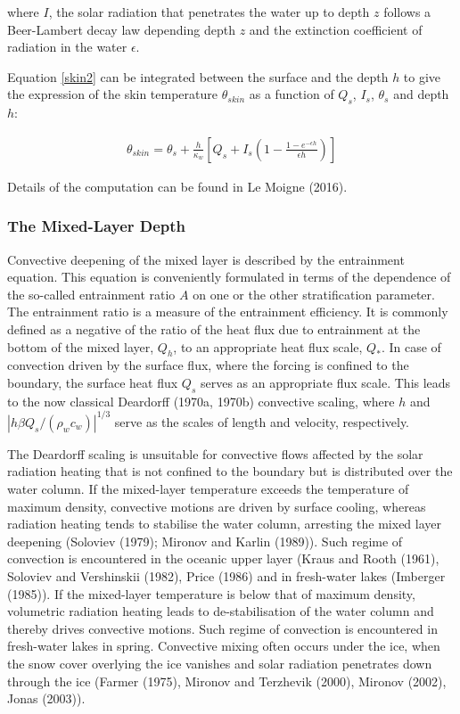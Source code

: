 where $I$, the solar radiation that penetrates the water up to depth $z$ follows a Beer-Lambert decay law 
depending depth $z$ and the extinction coefficient of radiation in the water $\epsilon$.

Equation \ref{skin2} can be integrated between the surface and the depth $h$ to give the 
expression of the skin temperature $\theta_{skin}$ as a function of $Q_s$, $I_s$, $\theta_s$ and depth $h$:

\begin{eqnarray}\label{skin3}
\theta_{skin} = \theta_{s} + \frac{h}{\kappa_w}\left[ Q_s+I_s\left(1-\frac{1-e^{-\epsilon h}}{\epsilon h} \right)\right] 
\end{eqnarray}

Details of the computation can be found in Le Moigne \etal (2016)\nocite{LeMoigne_2016}.


\subsubsection{The Mixed-Layer Depth}
\nopagebreak 
%
\noindent
Convective deepening of the mixed layer is described by the entrainment equation. 
This equation is conveniently formulated in terms of the dependence
of the so-called entrainment ratio $A$ on one or the other stratification parameter. 
The entrainment ratio is a measure of the entrainment efficiency.
It is commonly defined as a negative of the
ratio of the heat flux due to entrainment 
at the bottom of the mixed layer, $Q_h$, 
to an appropriate heat flux scale, $Q_*$. 
In case of convection driven by the surface flux,
where the forcing is confined to the boundary,
the surface heat flux $Q_s$ serves as an appropriate flux scale.
This leads to the now classical Deardorff (1970a, 1970b)\nocite{deardorff1970a,deardorff1970b} convective scaling,
where $h$ and $|h\beta Q_s/(\rho_w c_w)|^{1/3}$ 
serve as the scales of length and velocity, respectively. 

The Deardorff scaling is unsuitable for convective flows
affected by the solar radiation heating that is not 
confined to the boundary but is distributed over the water column.
If the mixed-layer temperature exceeds the temperature of maximum density,
convective motions are driven by surface cooling,
whereas radiation heating tends to stabilise the water column,
arresting the mixed layer deepening
(Soloviev (1979)\nocite{soloviev1979}; Mironov and Karlin (1989)\nocite{mironov1989}).
Such regime of convection is encountered in the oceanic upper layer 
(\eg Kraus and Rooth (1961)\nocite{kraus1961}, Soloviev and Vershinskii (1982)\nocite{soloviev1982}, Price \etal (1986)\nocite{price1986} 
and in fresh-water lakes (\eg Imberger (1985)\nocite{imberger1985}).
If the mixed-layer temperature is below that of maximum density,
volumetric radiation heating leads to de-stabilisation of
the water column and thereby drives convective motions.
Such regime of convection is encountered in fresh-water lakes in spring.
Convective mixing often occurs under the ice, 
when the snow cover overlying the ice vanishes and
solar radiation penetrates down through the ice 
(\eg Farmer (1975)\nocite{farmer1975}, Mironov and Terzhevik (2000)\nocite{mironov2000}, Mironov \etal (2002)\nocite{mironov2002}, Jonas \etal (2003)\nocite{jonas2003}).

